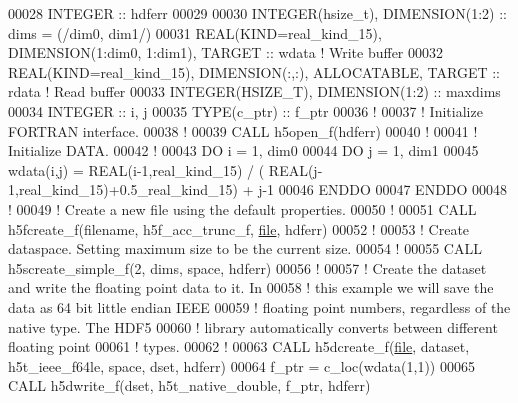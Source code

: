 \begin{DoxyCode}
00028   \textcolor{keywordtype}{INTEGER} :: hdferr
00029 
00030   \textcolor{keywordtype}{INTEGER(hsize\_t)},   \textcolor{keywordtype}{DIMENSION(1:2)} :: dims = (/dim0, dim1/)
00031   \textcolor{keywordtype}{REAL(KIND=real\_kind\_15)}, \textcolor{keywordtype}{DIMENSION(1:dim0, 1:dim1)}, \textcolor{keywordtype}{TARGET} :: wdata \textcolor{comment}{! Write buffer}
00032   \textcolor{keywordtype}{REAL(KIND=real\_kind\_15)}, \textcolor{keywordtype}{DIMENSION(:,:)}, \textcolor{keywordtype}{ALLOCATABLE}, \textcolor{keywordtype}{TARGET} :: rdata \textcolor{comment}{! Read buffer}
00033   \textcolor{keywordtype}{INTEGER(HSIZE\_T)}, \textcolor{keywordtype}{DIMENSION(1:2)} :: maxdims
00034   \textcolor{keywordtype}{INTEGER} :: i, j
00035   \textcolor{keywordtype}{TYPE}(c\_ptr) :: f\_ptr
00036   \textcolor{comment}{!}
00037   \textcolor{comment}{! Initialize FORTRAN interface.}
00038   \textcolor{comment}{!}
00039   \textcolor{keyword}{CALL }h5open\_f(hdferr)
00040   \textcolor{comment}{!}
00041   \textcolor{comment}{! Initialize DATA.}
00042   \textcolor{comment}{!}
00043   \textcolor{keywordflow}{DO} i = 1, dim0
00044      \textcolor{keywordflow}{DO} j = 1, dim1
00045         wdata(i,j) = \textcolor{keywordtype}{REAL(i-1,real\_kind\_15)} / ( \textcolor{keywordtype}{REAL}(j-1,real\_kind\_15)+0.5\_real\_kind\_15) + j-1
00046 \textcolor{keywordflow}{     ENDDO}
00047 \textcolor{keywordflow}{  ENDDO}
00048   \textcolor{comment}{!}
00049   \textcolor{comment}{! Create a new file using the default properties.}
00050   \textcolor{comment}{!}
00051   \textcolor{keyword}{CALL }h5fcreate\_f(filename, h5f\_acc\_trunc\_f, \hyperlink{structfile}{file}, hdferr)
00052   \textcolor{comment}{!}
00053   \textcolor{comment}{! Create dataspace.  Setting maximum size to be the current size.}
00054   \textcolor{comment}{!}
00055   \textcolor{keyword}{CALL }h5screate\_simple\_f(2, dims, space, hdferr)
00056   \textcolor{comment}{!}
00057   \textcolor{comment}{! Create the dataset and write the floating point data to it.  In}
00058   \textcolor{comment}{! this example we will save the data as 64 bit little endian IEEE}
00059   \textcolor{comment}{! floating point numbers, regardless of the native type.  The HDF5}
00060   \textcolor{comment}{! library automatically converts between different floating point}
00061   \textcolor{comment}{! types.}
00062   \textcolor{comment}{!}
00063   \textcolor{keyword}{CALL }h5dcreate\_f(\hyperlink{structfile}{file}, dataset, h5t\_ieee\_f64le, space, dset, hdferr)
00064   f\_ptr = c\_loc(wdata(1,1))
00065   \textcolor{keyword}{CALL }h5dwrite\_f(dset, h5t\_native\_double, f\_ptr, hdferr)

\end{DoxyCode}
